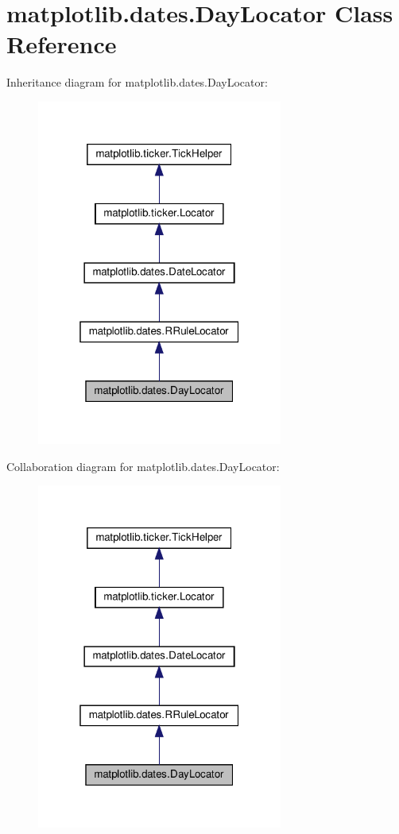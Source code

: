 \hypertarget{classmatplotlib_1_1dates_1_1DayLocator}{}\section{matplotlib.\+dates.\+Day\+Locator Class Reference}
\label{classmatplotlib_1_1dates_1_1DayLocator}


Inheritance diagram for matplotlib.\+dates.\+Day\+Locator\+:
\nopagebreak
\begin{figure}[H]
\begin{center}
\leavevmode
\includegraphics[width=229pt]{classmatplotlib_1_1dates_1_1DayLocator__inherit__graph}
\end{center}
\end{figure}


Collaboration diagram for matplotlib.\+dates.\+Day\+Locator\+:
\nopagebreak
\begin{figure}[H]
\begin{center}
\leavevmode
\includegraphics[width=229pt]{classmatplotlib_1_1dates_1_1DayLocator__coll__graph}
\end{center}
\end{figure}
